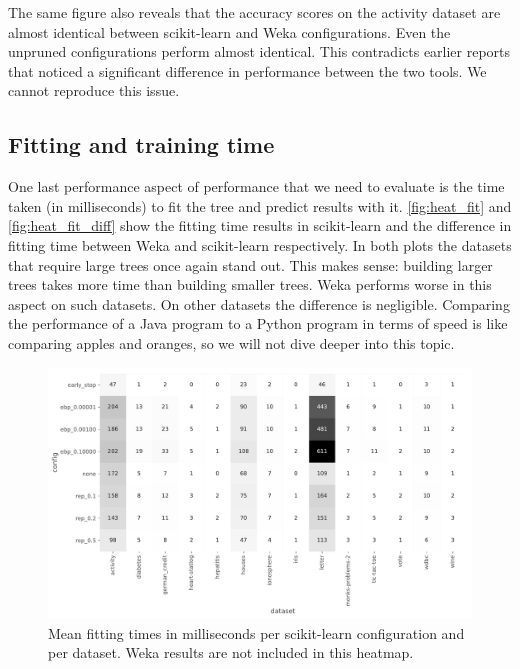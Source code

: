The same figure also reveals that the accuracy scores on the activity dataset are almost identical between scikit-learn and Weka configurations. Even the unpruned configurations perform almost identical. This contradicts earlier reports that noticed a significant difference in performance between the two tools. We cannot reproduce this issue.

\subsection{Fitting and training time}
One last performance aspect of performance that we need to evaluate is the time taken (in milliseconds) to fit the tree and predict results with it. \autoref{fig:heat_fit} and \autoref{fig:heat_fit_diff} show the fitting time results in scikit-learn and the difference in fitting time between Weka and scikit-learn respectively. In both plots the datasets that require large trees once again stand out. This makes sense: building larger trees takes more time than building smaller trees. Weka performs worse in this aspect on such datasets. On other datasets the difference is negligible. Comparing the performance of a Java program to a Python program in terms of speed is like comparing apples and oranges, so we will not dive deeper into this topic.

\begin{figure}[htp]
    \includegraphics[width=\textwidth]{img/heatmap_fit_time.pdf}
    \caption{Mean fitting times in milliseconds per scikit-learn configuration and per dataset. Weka results are not included in this heatmap.}%
    \label{fig:heat_fit}
\end{figure}

